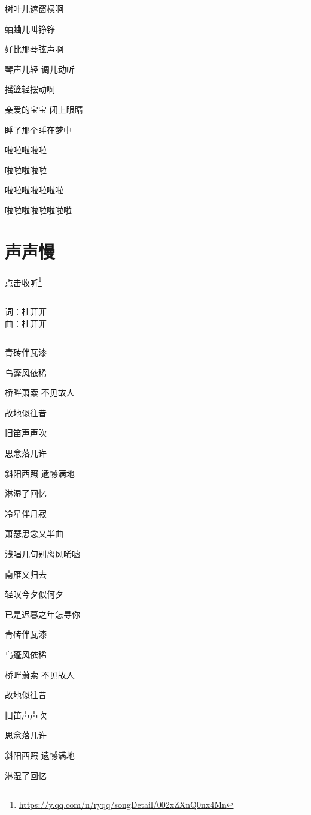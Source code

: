 \documentclass[]{ctexbook}
\renewcommand{\href}[2]{#2\footnote{\url{#1}}}
\begin{document}
树叶儿遮窗棂啊

蛐蛐儿叫铮铮

好比那琴弦声啊

琴声儿轻 调儿动听

摇篮轻摆动啊

亲爱的宝宝 闭上眼睛

睡了那个睡在梦中

啦啦啦啦啦

啦啦啦啦啦

啦啦啦啦啦啦啦

啦啦啦啦啦啦啦啦

\section*{声声慢}\label{say-slowly}


\href{https://y.qq.com/n/ryqq/songDetail/002xZXnQ0nx4Mn}{点击收听}

\begin{center}\rule{0.5\linewidth}{0.5pt}\end{center}

词：杜菲菲\\
曲：杜菲菲

\begin{center}\rule{0.5\linewidth}{0.5pt}\end{center}

青砖伴瓦漆

乌蓬风依稀

桥畔萧索 不见故人

故地似往昔

旧笛声声吹

思念落几许

斜阳西照 遗憾满地

淋湿了回忆

冷星伴月寂

萧瑟思念又半曲

浅唱几句别离风唏嘘

南雁又归去

轻叹今夕似何夕

已是迟暮之年怎寻你

青砖伴瓦漆

乌蓬风依稀

桥畔萧索 不见故人

故地似往昔

旧笛声声吹

思念落几许

斜阳西照 遗憾满地

淋湿了回忆
\end{document}

